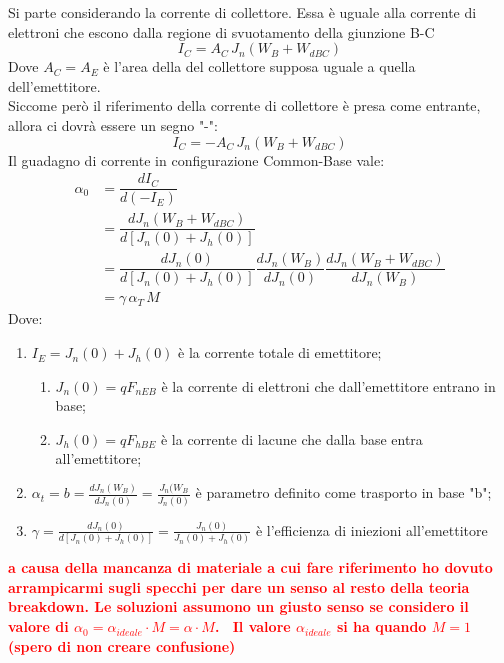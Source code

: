 \begin{exbox}
Si parte considerando la corrente di collettore. Essa è uguale alla corrente di elettroni che escono dalla regione di svuotamento della giunzione B-C
\begin{equation*}
    I_C= A_C \,J_n(W_B+W_{dBC})
\end{equation*}
Dove $A_C=A_E$ è l'area della del collettore supposa uguale a quella dell'emettitore.\\
Siccome però il riferimento della corrente di collettore è presa come entrante, allora ci dovrà essere un segno "-":
\begin{equation*}
    I_C=- A_C \,J_n(W_B+W_{dBC})
\end{equation*}
Il guadagno di corrente in configurazione Common-Base vale:
\begin{align*}
    \alpha_0 &=\dfrac{dI_C}{d(-I_E)}\\
             &=\dfrac{dJ_n(W_B+W_{dBC})}{d[J_n(0)+J_h(0)]}\\
             &=\dfrac{dJ_n(0)}{d[J_n(0)+J_h(0)]}\dfrac{dJ_n(W_B)}{dJ_n(0)}\dfrac{dJ_n(W_B+W_{dBC})}{dJ_n(W_B)}\\
             &=\gamma \, \alpha_T \, M
\end{align*} 
Dove:
\begin{enumerate}
    \item $I_E=J_n(0)+J_h(0)$ è la corrente totale di emettitore;
    \begin{enumerate}
        \item $J_n(0)=qF_{nEB}$ è la corrente di elettroni che dall'emettitore entrano in base;
        \item $J_h(0)=qF_{hBE}$ è la corrente di lacune che dalla base entra all'emettitore;
    \end{enumerate}
    \item $\alpha_t=b=\frac{dJ_n(W_B)}{dJ_n(0)}=\frac{J_n(W_B}{J_n(0)}$ è parametro definito come trasporto in base "b";
    \item $\gamma=\frac{dJ_n(0)}{d[J_n(0)+J_h(0)]}=\frac{J_n(0)}{J_n(0)+J_h(0)}$ è l'efficienza di iniezioni all'emettitore
\end{enumerate}
\textbf{\textcolor{red}{a causa della mancanza di materiale a cui fare riferimento ho dovuto arrampicarmi sugli specchi per dare un senso al resto della teoria breakdown. Le soluzioni assumono un giusto senso se considero il valore di $\alpha_0=\alpha_{ideale}\cdot M= \alpha \cdot M$. \
Il valore $\alpha_{ideale}$ si ha quando $M=1$ (spero di non creare confusione) }}
 
\end{exbox}
